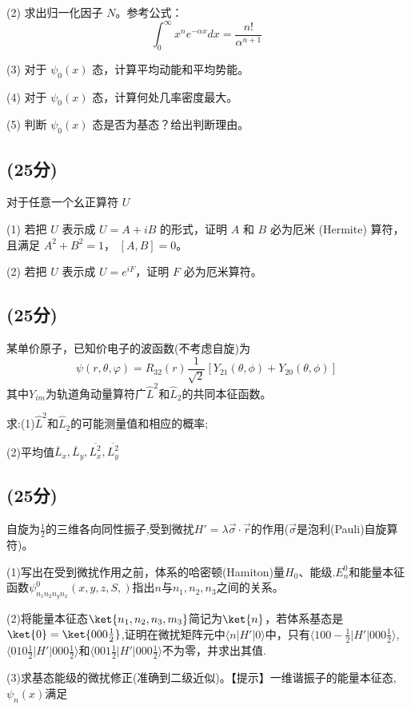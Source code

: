(2) 求出归一化因子 $N$。参考公式：
\[\int_0^\infty x^n e^{- \alpha x} dx = \frac{n!}{\alpha^{n+1}}~\]

(3) 对于 $\psi_0(x)$ 态，计算平均动能和平均势能。

(4) 对于 $\psi_0(x)$ 态，计算何处几率密度最大。

(5) 判断 $\psi_0(x)$ 态是否为基态？给出判断理由。
\subsection{(25分)}
对于任意一个幺正算符 \( U \)

(1) 若把 \( U \) 表示成 \( U = A + iB \) 的形式，证明 \( A \) 和 \( B \) 必为厄米 (Hermite) 算符，且满足 \( A^2 + B^2 = 1 \)， \([A, B] = 0 \)。

(2) 若把 \( U \) 表示成 \( U = e^{iF} \)，证明 \( F \) 必为厄米算符。
\subsection{(25分)}
某单价原子，已知价电子的波函数(不考虑自旋)为
$$\psi(r,\theta,\varphi)=R_{32}(r)\frac{1}{\sqrt{2}}[Y_{21}(\theta,\phi)+Y_{20}(\theta,\phi)]~$$
其中$Y_{im}$为轨道角动量算符广$\hat{L}^2$和$\hat{L}_2$的共同本征函数。

求:(1)$\hat{L}^2$和$\hat{L}_2$的可能测量值和相应的概率;

(2)平均值$\overline{L}_x,\overline{L}_y,\overline{L^2_x},\overline{L^2_y}$
\subsection{(25分)}
自旋为$\frac{1}{2}$的三维各向同性振子,受到微扰$H'=\lambda \vec{\sigma}\cdot \vec{r}$的作用($\vec{\sigma}$是泡利(Pauli)自旋算符)。

(1)写出在受到微扰作用之前，体系的哈密顿(Hamiton)量$H_0$、能级.$E^0_n$和能量本征函数$\psi^0_{n_1n_2n_yn_x}(x,y,z,S,)$指出$n$与$n_1,n_2,n_3$之间的关系。

(2)将能量本征态$\ket{n_1,n_2,n_3,m_3}$简记为$\ket{n}$，若体系基态是$\ket{0}=\ket{000\frac{1}{2}}$,证明在微扰矩阵元中$\langle n | H' | 0 \rangle$中，只有$\langle 100-\frac{1}{2} | H' | 000\frac{1}{2} \rangle$,$\langle 010\frac{1}{2} | H' | 000\frac{1}{2} \rangle$和$\langle 001\frac{1}{2} | H' | 000\frac{1}{2} \rangle$不为零，并求出其值.

(3)求基态能级的微扰修正(准确到二级近似)。【提示】一维谐振子的能量本征态,$\psi_n(x)$满足
